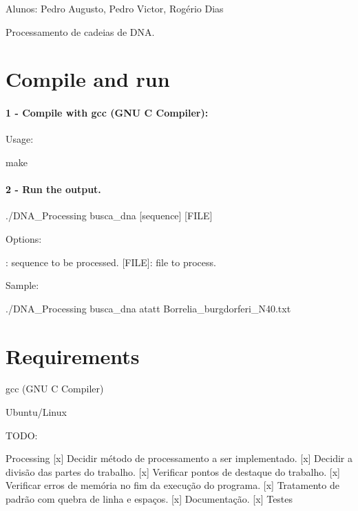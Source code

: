 Alunos\-: Pedro Augusto, Pedro Victor, Rogério Dias

Processamento de cadeias de D\-N\-A.

\section*{Compile and run}

\paragraph*{1 -\/ Compile with gcc (G\-N\-U C Compiler)\-:}

Usage\-: \begin{DoxyVerb}make
\end{DoxyVerb}


\paragraph*{2 -\/ Run the output.}

\begin{DoxyVerb}./DNA_Processing busca_dna [sequence] [FILE]
\end{DoxyVerb}


Options\-: \begin{DoxyVerb}[sequence]: sequence to be processed.
[FILE]: file to process.
\end{DoxyVerb}


Sample\-: \begin{DoxyVerb}./DNA_Processing busca_dna atatt Borrelia_burgdorferi_N40.txt
\end{DoxyVerb}


\section*{Requirements}


\begin{DoxyItemize}
\item gcc (G\-N\-U C Compiler)
\item Ubuntu/\-Linux
\end{DoxyItemize}

T\-O\-D\-O\-: \begin{DoxyVerb}[x] Processing
[x] Decidir método de processamento a ser implementado.
[x] Decidir a divisão das partes do trabalho.
[x] Verificar pontos de destaque do trabalho.
[x] Verificar erros de memória no fim da execução do programa.
[x] Tratamento de padrão com quebra de linha e espaços.
[x] Documentação.
[x] Testes\end{DoxyVerb}
 